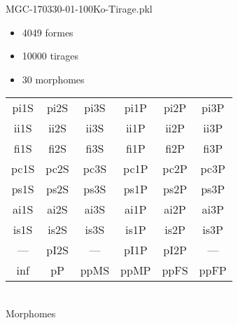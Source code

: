 MGC-170330-01-100Ko-Tirage.pkl
\begin{itemize}
\item 4049 formes
\item 10000 tirages
\item 30 morphomes
\end{itemize}
\begin{center}
\begin{tabular}{cccccc}
\hline
\cellcolor{white}pi1S & \cellcolor{white}pi2S & \cellcolor{white}pi3S & \cellcolor{white}pi1P & \cellcolor{white}pi2P & \cellcolor{white}pi3P\\
\cellcolor{brown}ii1S & \cellcolor{brown}ii2S & \cellcolor{brown}ii3S & \cellcolor{white}ii1P & \cellcolor{white}ii2P & \cellcolor{brown}ii3P\\
\cellcolor{yellow}fi1S & \cellcolor{lime}fi2S & \cellcolor{lime}fi3S & \cellcolor{green}fi1P & \cellcolor{white}fi2P & \cellcolor{green}fi3P\\
\cellcolor{yellow}pc1S & \cellcolor{yellow}pc2S & \cellcolor{yellow}pc3S & \cellcolor{white}pc1P & \cellcolor{white}pc2P & \cellcolor{yellow}pc3P\\
\cellcolor{teal}ps1S & \cellcolor{teal}ps2S & \cellcolor{teal}ps3S & \cellcolor{white}ps1P & \cellcolor{white}ps2P & \cellcolor{teal}ps3P\\
\cellcolor{lightgray}ai1S & \cellcolor{lightgray}ai2S & \cellcolor{lightgray}ai3S & \cellcolor{white}ai1P & \cellcolor{black}ai2P & \cellcolor{white}ai3P\\
\cellcolor{black}is1S & \cellcolor{black}is2S & \cellcolor{lightgray}is3S & \cellcolor{black}is1P & \cellcolor{black}is2P & \cellcolor{white}is3P\\
--- & \cellcolor{white}pI2S & --- & \cellcolor{white}pI1P & \cellcolor{white}pI2P & ---\\
\cellcolor{white}inf & \cellcolor{white}pP & \cellcolor{cyan}ppMS & \cellcolor{cyan}ppMP & \cellcolor{magenta}ppFS & \cellcolor{magenta}ppFP\\
\hline
\end{tabular}\\
Morphomes
\end{center}
\bigskip

